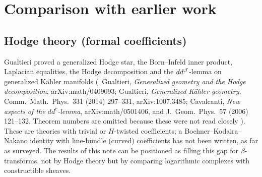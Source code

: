 \section{Comparison with earlier work}\label{sec:compare}
\subsection{Hodge theory (formal coefficients)}
Gualtieri proved a generalized Hodge star, the Born--Infeld inner product, Laplacian equalities, the Hodge decomposition and the $dd^{\mathcal J}$-lemma on generalized K\"ahler manifolds (\tC\ Gualtieri, \emph{Generalized geometry and the Hodge decomposition}, arXiv:math/0409093; Gualtieri, \emph{Generalized K\"ahler geometry}, Comm.\ Math.\ Phys.\ 331 (2014) 297--331, arXiv:1007.3485; Cavalcanti, \emph{New aspects of the $dd^c$-lemma}, arXiv:math/0501406, and J.\ Geom.\ Phys.\ 57 (2006) 121--132. Theorem numbers are omitted because these were not read closely \tQ). These are theories with trivial or $H$-twisted coefficients; a Bochner--Kodaira--Nakano identity with line-bundle (curved) coefficients has not been written, as far as surveyed. The results of this note can be positioned as filling this gap for $\beta$-transforms, not by Hodge theory but by comparing logarithmic complexes with constructible sheaves.

